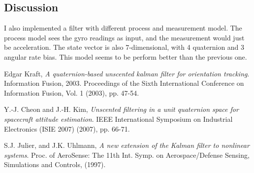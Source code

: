 \documentclass[twoside]{article}
\begin{document}
\begin{multicols}{2}
\section{Discussion}
I also implemented a filter with different process and measurement model. The process model sees the gyro readings as input, and the measurement would just be acceleration. The state vector is also 7-dimensional, with 4 quaternion and 3 angular rate bias. This model seems to be perform better than the previous one.

\begin{thebibliography}{2} %

Edgar Kraft, \emph{A quaternion-based unscented kalman filter for orientation tracking}. Information Fusion, 2003. Proceedings of the Sixth International Conference on Information Fusion, Vol. 1 (2003), pp. 47-54.

Y.-J. Cheon and J.-H. Kim, \emph{Unscented filtering in a unit quaternion space for spacecraft attitude estimation}. IEEE International Symposium on Industrial Electronics (ISIE 2007) (2007), pp. 66-71.

S.J. Julier, and J.K. Uhlmann, \emph{A new extension of the Kalman filter to nonlinear systems}. Proc. of AeroSense: The 11th Int. Symp. on Aerospace/Defense Sensing, Simulations and Controls, (1997).

\end{thebibliography}


\end{multicols}
\end{document}
